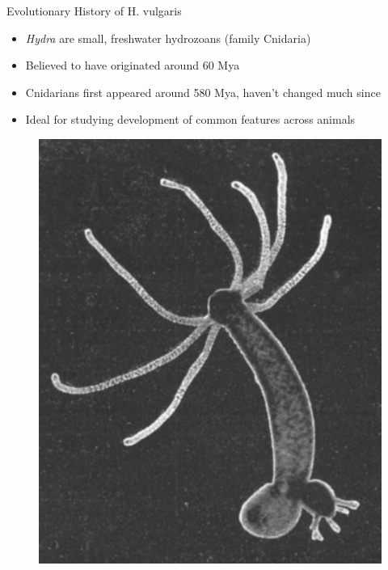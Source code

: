 \documentclass[leqno,presentation,unknownkeysallowed]{beamer}
\begin{document}
\begin{frame}{Evolutionary History of H. vulgaris}
\begin{itemize}
\item \textit{Hydra} are small, freshwater hydrozoans (family Cnidaria)
\item Believed to have originated around 60 Mya \cite{age}
\item Cnidarians first appeared around 580 Mya, haven't changed much since
\item Ideal for studying development of common features across animals
\end{itemize}
\begin{figure}
\center
\includegraphics[scale=0.20]{hydra.png}
\end{figure}
\end{frame}
\end{document}
